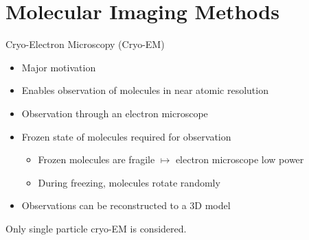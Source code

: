 
\section{Molecular Imaging Methods}	%

\begin{frame}[c]{Cryo-Electron Microscopy (Cryo-EM)}
    \begin{itemize}
        \item Major motivation
        \item Enables observation of molecules in near atomic resolution
        \item<2-> Observation through an electron microscope
        \item<2-> Frozen state of molecules required for observation
        \begin{itemize}
            \item<2-> Frozen molecules are fragile $\mapsto$ electron microscope low power
            \item<2-> During freezing, molecules rotate randomly
        \end{itemize}
        \item<2-> Observations can be reconstructed to a 3D model
    \end{itemize}

    \begin{tcolorbox}[colback=red!5!white,hide=<1-2>, alert=<3>, colframe=red!75!black]
        Only single particle cryo-EM is considered.
    \end{tcolorbox}

\end{frame}

